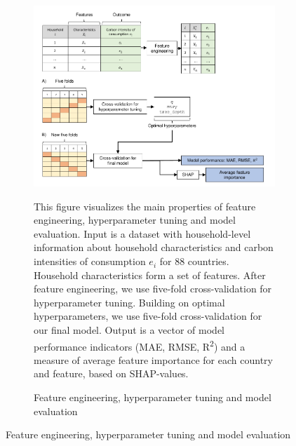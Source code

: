 \begin{figure}[ht!]\ContinuedFloat
   \begin{subfigure}[b]{\textwidth}
  \centering
  \includegraphics{1_Figures/Figures_Appendix/Graphical representation of data work_2.pdf}
  \caption{Feature engineering, hyperparameter tuning and model evaluation} \label{fig:data_visualisation_2}
  \begin{subcaption2}
    This figure visualizes the main properties of feature engineering, hyperparameter tuning and model evaluation. Input is a dataset with household-level information about household characteristics and carbon intensities of consumption $e_{i}$ for 88 countries. Household characteristics form a set of features. After feature engineering, we use five-fold cross-validation for hyperparameter tuning. Building on optimal hyperparameters, we use five-fold cross-validation for our final model. Output is a vector of model performance indicators (MAE, RMSE, R\textsuperscript{2}) and a measure of average feature importance for each country and feature, based on SHAP-values.
  \end{subcaption2}
\end{subfigure}
\end{figure}

\clearpage

